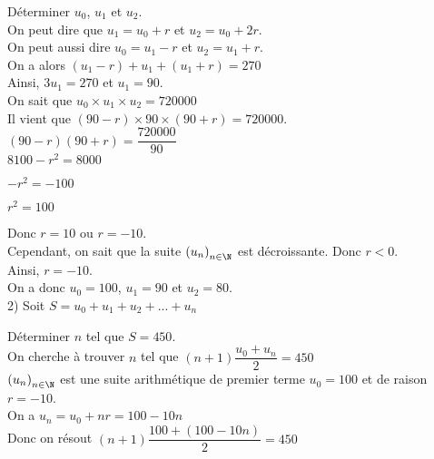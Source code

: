 Déterminer $u_0$, $u_1$ et $u_2$. \\

On peut dire que $u_1 = u_0 + r$ et $u_2 = u_0 + 2r$. \\ On peut aussi dire $u_0 = u_1 - r$ et $u_2 = u_1 + r$. \\

On a alors $\left(u_1 - r\right) + u_1 + \left(u_1 + r\right) = 270$ \\

Ainsi, $3u_1 = 270$ et $u_1 = 90$. \\

On sait que $u_0 \times u_1 \times u_2 = 720 000$ \\

Il vient que $\left(90 - r\right) \times 90 \times \left(90+r\right) = 720 000$. \\

$\left(90-r\right)\left(90+r\right) = \dfrac{720 000}{90}$ \\

$8100 - r^2 = 8000$ 

$-r^2 = -100$ 

$r^2 = 100$ 

Donc $r = 10$ ou $r = -10$. \\

Cependant, on sait que la suite $\left(u_n\right)_{n \in \N}$ est décroissante. Donc $r < 0$. \\

Ainsi, $r = -10$. \\

On a donc $u_0 = 100$, $u_1 = 90$ et $u_2 = 80$. \\

2) Soit $S = u_0 + u_1 + u_2 + ... + u_n$ 

Déterminer $n$ tel que $S = 450$. \\

On cherche à trouver $n$ tel que $\left(n+1\right)\dfrac{u_0 + u_n}{2} = 450$ \\

$\left(u_n\right)_{n \in \N}$ est une suite arithmétique de premier terme $u_0 = 100$ et de raison $r = -10$. \\

On a $u_n = u_0 + nr = 100 - 10n$ \\

Donc on résout $\left(n+1\right)\dfrac{100 + \left(100 -10n\right)}{2} = 450$ \\

